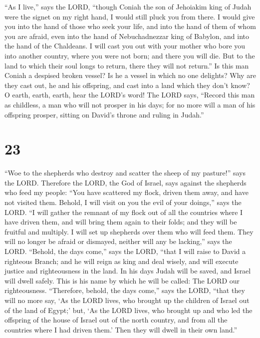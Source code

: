  ``As I live,'' says the LORD, ``though Coniah the son of
Jehoiakim king of Judah were the signet on my right hand, I would still
pluck you from there.  I would give you into the hand of
those who seek your life, and into the hand of them of whom you are
afraid, even into the hand of Nebuchadnezzar king of Babylon, and into
the hand of the Chaldeans.  I will cast you out with your
mother who bore you into another country, where you were not born; and
there you will die.  But to the land to which their soul
longs to return, there they will not return.''  Is this
man Coniah a despised broken vessel? Is he a vessel in which no one
delights? Why are they cast out, he and his offspring, and cast into a
land which they don't know?  O earth, earth, earth, hear
the LORD's word!  The LORD says, ``Record this man as
childless, a man who will not prosper in his days; for no more will a
man of his offspring prosper, sitting on David's throne and ruling in
Judah.''

\hypertarget{section-22}{%
\section{23}\label{section-22}}

 ``Woe to the shepherds who destroy and scatter the sheep
of my pasture!'' says the LORD.  Therefore the LORD, the
God of Israel, says against the shepherds who feed my people: ``You have
scattered my flock, driven them away, and have not visited them. Behold,
I will visit on you the evil of your doings,'' says the LORD.
 ``I will gather the remnant of my flock out of all the
countries where I have driven them, and will bring them again to their
folds; and they will be fruitful and multiply.  I will set
up shepherds over them who will feed them. They will no longer be afraid
or dismayed, neither will any be lacking,'' says the LORD.
 ``Behold, the days come,'' says the LORD, ``that I will
raise to David a righteous Branch; and he will reign as king and deal
wisely, and will execute justice and righteousness in the land.
 In his days Judah will be saved, and Israel will dwell
safely. This is his name by which he will be called: The LORD our
righteousness.  ``Therefore, behold, the days come,'' says
the LORD, ``that they will no more say, `As the LORD lives, who brought
up the children of Israel out of the land of Egypt;'  but,
`As the LORD lives, who brought up and who led the offspring of the
house of Israel out of the north country, and from all the countries
where I had driven them.' Then they will dwell in their own land.''


